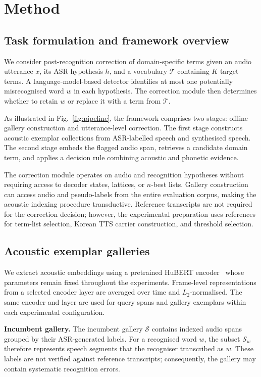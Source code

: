 \documentclass{article}
\newcommand{\Sgal}{\mathcal{S}}
\newcommand{\Tlist}{\mathcal{T}}
\begin{document}
\section{Method}
\label{sec:method}

\subsection{Task formulation and framework overview}

We consider post-recognition correction of domain-specific terms given an audio utterance $x$, its ASR hypothesis $h$, and a vocabulary $\Tlist$ containing $K$ target terms. A language-model-based detector identifies at most one potentially misrecognised word $w$ in each hypothesis. The correction module then determines whether to retain $w$ or replace it with a term from $\Tlist$.

As illustrated in Fig.~\ref{fig:pipeline}, the framework comprises two stages: offline gallery construction and utterance-level correction. The first stage constructs acoustic exemplar collections from ASR-labelled speech and synthesised speech. The second stage embeds the flagged audio span, retrieves a candidate domain term, and applies a decision rule combining acoustic and phonetic evidence.

The correction module operates on audio and recognition hypotheses without requiring access to decoder states, lattices, or $n$-best lists. Gallery construction can access audio and pseudo-labels from the entire evaluation corpus, making the acoustic indexing procedure transductive. Reference transcripts are not required for the correction decision; however, the experimental preparation uses references for term-list selection, Korean TTS carrier construction, and threshold selection.

\subsection{Acoustic exemplar galleries}
\label{sec:galleries}

We extract acoustic embeddings using a pretrained HuBERT
encoder~\cite{hsu2021hubert} whose parameters remain fixed throughout the experiments. Frame-level representations from a selected encoder layer are averaged over time and $L_2$-normalised. The same encoder and layer are used for query spans and gallery exemplars within each experimental configuration.

\textbf{Incumbent gallery.} The incumbent gallery $\Sgal$ contains indexed audio spans grouped by their ASR-generated labels. For a recognised word $w$, the subset $\Sgal_w$ therefore represents speech segments that the recogniser transcribed as $w$. These labels are not verified against reference transcripts; consequently, the gallery may contain systematic recognition errors.
\end{document}
